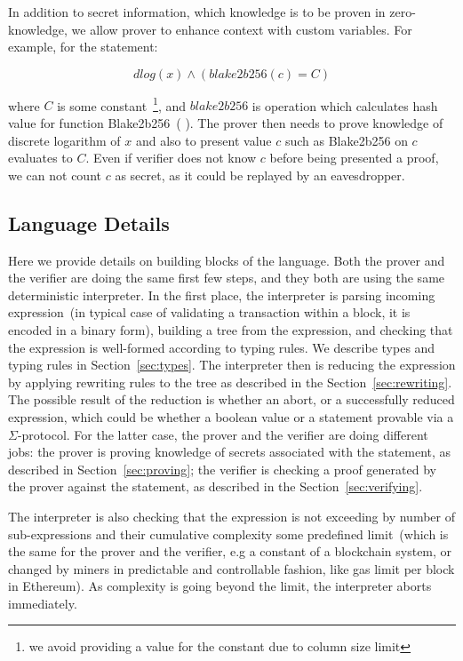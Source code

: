 \documentclass[11pt]{llncs}
\newcommand{\authnote}[2]{\marginpar{\parbox{\marginparwidth}{\tiny %
  \textsf{#1 {\textcolor{blue}{notes: #2}}}}}%
  \textcolor{blue}{\textbf{\dag}}}
\newcommand{\authnote}[2]{
  \textsf{#1 \textcolor{blue}{: #2}}}
\newcommand{\authnote}[2]{}
\newcommand{\knote}[1]{{\authnote{\textcolor{green}{kushti notes}}{#1}}}
\begin{document}
In addition to secret information, which knowledge is to be proven in zero-knowledge, we allow prover to enhance context with custom variables. For example, for the statement:

$$dlog(x) \land (blake2b256(c) = C)$$

where $C$ is some constant~\footnote{we avoid providing a value for the constant due to column size limit}, and $blake2b256$ is operation which calculates hash value for function Blake2b256~(\knote{link}). The prover then needs to prove knowledge of discrete logarithm of $x$ and also to present value $c$ such as Blake2b256 on $c$ evaluates to $C$. Even if verifier does not know $c$ before being presented a proof, we can not count $c$ as secret, as it could be replayed by an eavesdropper.



\subsection{Language Details} 
\label{sec:lang-details}

Here we provide details on building blocks of the language.  
Both the prover and the verifier are doing the same first few steps, and they both are using the same deterministic interpreter. In the first place, the interpreter is parsing incoming expression~(in typical case of validating a transaction within a block, it is encoded in a binary form), building a tree from the expression, and checking that the expression is well-formed according to typing rules. We describe types and typing rules in Section~\ref{sec:types}. The interpreter then is reducing the expression by applying rewriting rules to the tree as described in the Section~\ref{sec:rewriting}. The possible result of the reduction is whether an abort, or a successfully reduced expression, which could be whether a boolean value or a statement provable via a $\Sigma$-protocol. For the latter case, the prover and the verifier are doing different jobs: the prover is proving knowledge of secrets associated with the statement, as described in Section~\ref{sec:proving}; the verifier is checking a proof generated by the prover against the statement, as described in the Section~\ref{sec:verifying}.   

The interpreter is also checking that the expression is not exceeding by number of sub-expressions and their cumulative complexity some predefined limit~(which is the same for the prover and the verifier, e.g a constant of a blockchain system, or changed by miners in predictable and controllable fashion, like gas limit per block in Ethereum). As complexity is going beyond the limit, the interpreter aborts immediately. 
\end{document}
